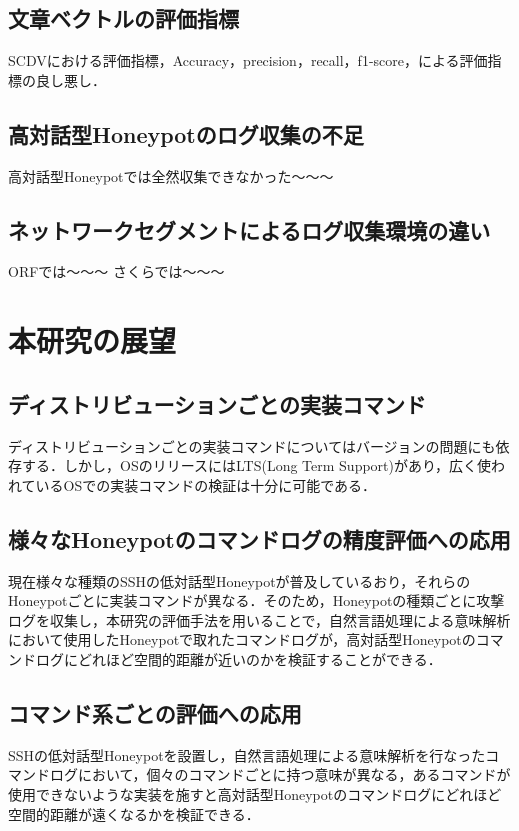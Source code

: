 \subsection{文章ベクトルの評価指標}
SCDVにおける評価指標，Accuracy，precision，recall，f1-score，による評価指標の良し悪し．

\subsection{高対話型Honeypotのログ収集の不足}
高対話型Honeypotでは全然収集できなかった〜〜〜

\subsection{ネットワークセグメントによるログ収集環境の違い}
ORFでは〜〜〜
さくらでは〜〜〜


\section{本研究の展望}
\subsection{ディストリビューションごとの実装コマンド}
ディストリビューションごとの実装コマンドについてはバージョンの問題にも依存する．しかし，OSのリリースにはLTS(Long Term Support)があり，広く使われているOSでの実装コマンドの検証は十分に可能である．

\subsection{様々なHoneypotのコマンドログの精度評価への応用}
現在様々な種類のSSHの低対話型Honeypotが普及しているおり，それらのHoneypotごとに実装コマンドが異なる．そのため，Honeypotの種類ごとに攻撃ログを収集し，本研究の評価手法を用いることで，自然言語処理による意味解析において使用したHoneypotで取れたコマンドログが，高対話型Honeypotのコマンドログにどれほど空間的距離が近いのかを検証することができる．

\subsection{コマンド系ごとの評価への応用}
SSHの低対話型Honeypotを設置し，自然言語処理による意味解析を行なったコマンドログにおいて，個々のコマンドごとに持つ意味が異なる，あるコマンドが使用できないような実装を施すと高対話型Honeypotのコマンドログにどれほど空間的距離が遠くなるかを検証できる．
